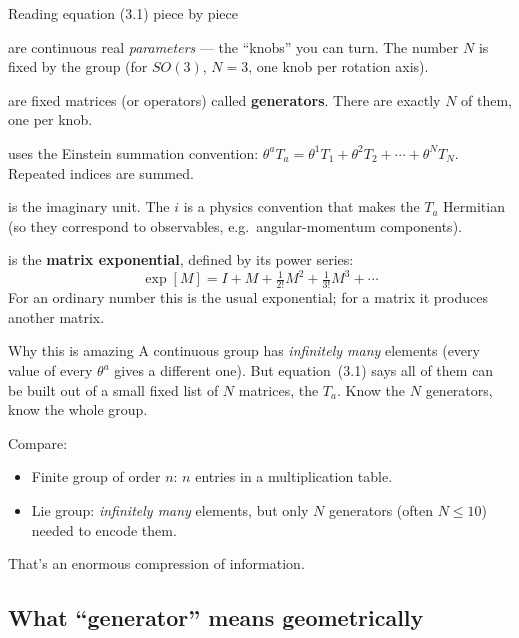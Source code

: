 \documentclass[11pt]{article}
\begin{document}
\begin{keybox}{Reading equation (3.1) piece by piece}
\begin{description}[style=nextline, leftmargin=0pt, itemsep=4pt]
  \item[$\theta^1, \ldots, \theta^N$] are continuous real \emph{parameters} ---
    the ``knobs'' you can turn. The number $N$ is fixed by the group
    (for $SO(3)$, $N=3$, one knob per rotation axis).
  \item[$T_a$, $a = 1,\ldots,N$] are fixed matrices (or operators) called
    \textbf{generators}. There are exactly $N$ of them, one per knob.
  \item[$\theta^a T_a$] uses the Einstein summation convention:
    $\theta^a T_a = \theta^1 T_1 + \theta^2 T_2 + \cdots + \theta^N T_N$.
    Repeated indices are summed.
  \item[$i$] is the imaginary unit. The $i$ is a physics convention that
    makes the $T_a$ Hermitian (so they correspond to observables, e.g.\
    angular-momentum components).
  \item[{$\exp[\,\cdot\,]$}] is the \textbf{matrix exponential},
    defined by its power series:
    \[ \exp[M] = I + M + \tfrac{1}{2!} M^2 + \tfrac{1}{3!} M^3 + \cdots \]
    For an ordinary number this is the usual exponential; for a matrix
    it produces another matrix.
\end{description}
\end{keybox}

\begin{intuitionbox}{Why this is amazing}
A continuous group has \emph{infinitely many} elements (every value of
every $\theta^a$ gives a different one). But equation~(3.1) says all of
them can be built out of a small fixed list of $N$ matrices, the $T_a$.
Know the $N$ generators, know the whole group.

Compare:
\begin{itemize}[leftmargin=1.5em, itemsep=2pt]
  \item Finite group of order $n$: $n$ entries in a multiplication table.
  \item Lie group: \emph{infinitely many} elements, but only $N$
    generators (often $N \leq 10$) needed to encode them.
\end{itemize}
That's an enormous compression of information.
\end{intuitionbox}

\subsection*{What ``generator'' means geometrically}
\end{document}
